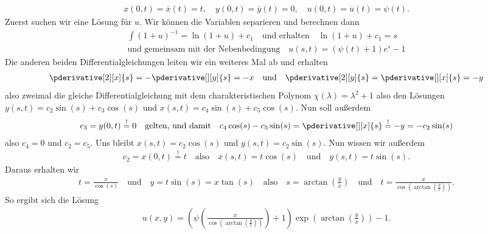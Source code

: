 \begin{solution}
	\begin{align*}
	x(0, t) = \overline{x}(t) = t, \quad
	y(0, t) = \overline{y}(t) = 0, \quad
	u(0, t) = \overline{u}(t) = \psi(t).
	\end{align*}
	Zuerst suchen wir eine Lösung für $u$. Wir können die Variablen separieren und berechnen dann
	\begin{align*}
	\int (1 + u)^{-1} = \ln(1 + u) + c_1 \quad \text{und erhalten} \quad \ln(1 + u) + c_1 = s \\ \text{und gemeinsam mit der Nebenbedingung} \quad u(s,t) = (\psi(t) + 1) e^s - 1
	\end{align*}
	Die anderen beiden Differentialgleichungen leiten wir ein weiteres Mal ab und erhalten
	\begin{align*}
	\pderivative[2][x]{s} = - \pderivative[][y]{s} = -x \quad \text{und} \quad \pderivative[2][y]{s} = \pderivative[][x]{s} = -y
	\end{align*}
	also zweimal die gleiche Differentialgleichung mit dem charakteristischen Polynom $\chi(\lambda) = \lambda^2 + 1$ also den Lösungen $y(s,t) = c_2 \sin(s) + c_3 \cos(s)$ und $x(s,t) = c_4 \sin(s) + c_5 \cos(s)$.
	Nun soll außerdem
	\begin{align*}
	c_3 = y(0,t) \stackrel{!}{=} 0 \quad \text{gelten, und damit} \quad c_4 \cos(s) - c_5 \sin(s) = \pderivative[][x]{s} \stackrel{!}{=} -y = -c_2 \sin(s)
	\end{align*}
	also $c_4 = 0$ und $c_2 = c_5$. Uns bleibt $x(s,t) = c_2 \cos(s)$ und $y(s,t) = c_2 \sin(s)$. Nun wissen wir außerdem
	\begin{align*}
	c_2 = x(0,t) \stackrel{!}{=} t \quad \text{also} \quad x(s,t) = t \cos(s) \quad \text{und} \quad y(s,t) = t \sin(s).
	\end{align*}
	Daraus erhalten wir
	\begin{align*}
	t = \frac{x}{\cos(s)} \quad \text{und} \quad y = t \sin(s) = x \tan(s) \quad \text{also} \quad s = \arctan\left(\frac{y}{x}\right) \quad \text{und} \quad t = \frac{x}{\cos\left(\arctan\left(\frac{y}{x}\right)\right)}.
	\end{align*}
	So ergibt sich die Lösung
	\begin{align*}
	u(x,y) = \left(\psi\left(\frac{x}{\cos\left(\arctan\left(\frac{y}{x}\right)\right)}\right) + 1\right) \exp\left(\arctan\left(\frac{y}{x}\right)\right) - 1.
	\end{align*}
\end{solution}

